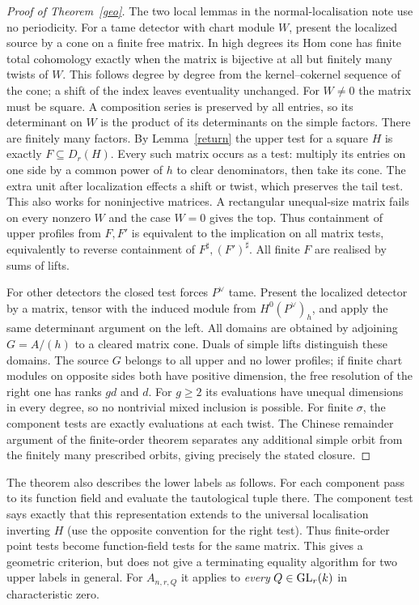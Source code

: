 \documentclass[11pt]{article}
\begin{document}
\begin{proof}[Proof of Theorem~\ref{geo}]
The two local lemmas in the normal-localisation note use no periodicity.
For a tame detector with chart module $W$, present the localized source
by a cone on a finite free matrix. In high degrees its Hom cone has
finite total cohomology exactly when the matrix is bijective at all
but finitely many twists of $W$. This follows degree by degree from
the kernel--cokernel sequence of the cone; a shift of the index leaves
eventuality unchanged. For $W\ne0$ the matrix must be square.
A composition series is preserved by all entries, so its determinant
on $W$ is the product of its determinants on the simple factors.
There are finitely many factors. By Lemma~\ref{return} the upper
test for a square $H$ is exactly $F\subseteq D_r(H)$. Every such
matrix occurs as a test: multiply its entries on one side by a common
power of $h$ to clear denominators, then take its cone. The extra
unit after localization effects a shift or twist, which preserves
the tail test. This also works for noninjective matrices. A rectangular
unequal-size matrix fails on every nonzero $W$ and the case $W=0$
gives the top. Thus containment of upper profiles from $F,F'$ is
equivalent to the implication on all matrix tests, equivalently to
reverse containment of $F^\sharp,(F')^\sharp$. All finite $F$ are
realised by sums of lifts.

For other detectors the closed test forces $P^\vee$ tame. Present the
localized detector by a matrix, tensor with the induced module from
$H^0(P^\vee)_h$, and apply the same determinant argument on the left.
All domains are obtained by adjoining $G=A/(h)$ to a cleared matrix
cone. Duals of simple lifts distinguish these domains. The source
$G$ belongs to all upper and no lower profiles; if finite chart modules
on opposite sides both have positive dimension, the free resolution
of the right one has ranks $gd$ and $d$. For $g\ge2$ its evaluations
have unequal dimensions in every degree, so no nontrivial mixed
inclusion is possible. For finite $\sigma$, the component tests are
exactly evaluations at each twist. The Chinese remainder argument of
the finite-order theorem separates any additional simple orbit from
the finitely many prescribed orbits, giving precisely the stated closure.
\end{proof}

The theorem also describes the lower labels as follows. For each
component pass to its function field and evaluate the tautological
tuple there. The component test says exactly that this representation
extends to the universal localisation inverting $H$ (use the opposite
convention for the right test). Thus finite-order point tests become
function-field tests for the same matrix. This gives a geometric
criterion, but does not give a terminating equality algorithm for two
upper labels in general. For $A_{n,r,Q}$ it applies to \emph{every}
$Q\in{\rm GL}_r(k)$ in characteristic zero.
\end{document}
